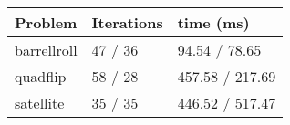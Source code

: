 \begin{tabular}{lll}
\toprule 
Problem & Iterations & time (ms) \\
\midrule 
barrellroll & 47 / 36 & 94.54 / 78.65 \\
quadflip & 58 / 28 & 457.58 / 217.69 \\
satellite & 35 / 35 & 446.52 / 517.47 \\
\bottomrule 
\end{tabular}
